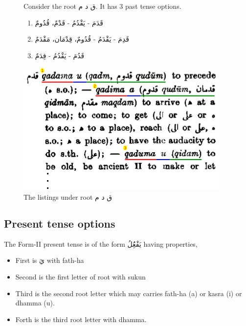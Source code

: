 \begin{figure}[h]
	
	 \begin{minipage}{.5\textwidth}
		Consider the root \textarabic{ق د م}. It has 3 past tense options. 
		\begin{enumerate}	    \setlength{\itemsep}{5pt}
			\item \textarabic{قَدَمَ - يَقْدُمُ - قَدْمٌ، قُدُومٌ}
			\item \textarabic{قَدِمَ - يَقْدَمُ - قُدُومٌ، قِدْمَان، مَقْدَمٌ}
			\item \textarabic{قَدُمَ - يَقْدُمُ - قِدَمٌ}
		\end{enumerate}
	\end{minipage}
	 \begin{minipage}{.5\textwidth}
	 		\centering
	 		\includegraphics[width=0.9\linewidth]{./chapters/images/hansqdm}
	 		\caption{The listings under root \textarabic{ق د م}}
	 		\label{fig:hans-qdm}
	 \end{minipage}
\end{figure}
 
\subsection{Present tense options}
The Form-II present tense is of the form \textarabic{يَفْعَُِلُ} having properties,
\begin{itemize}	    %
	\item First is \textarabic{يَ} with fath-ha
	\item Second is the first letter of root with sukun
	\item Third is the second root letter which may carries fath-ha (a) or kasra (i) or dhamma (u). 
	\item Forth is the third root letter with dhamma. 
\end{itemize}


